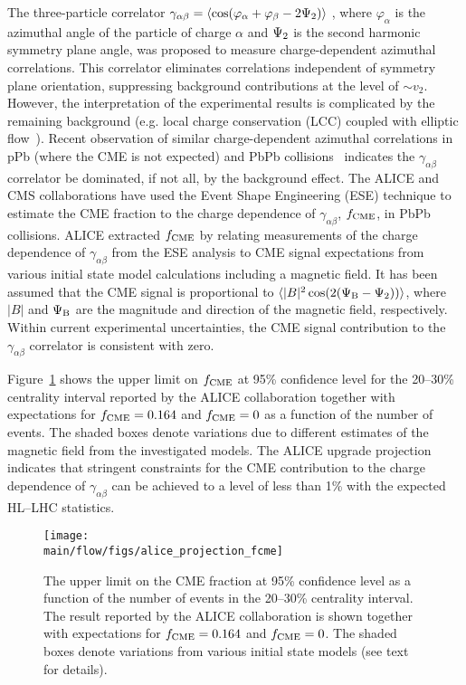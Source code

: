 The three-particle correlator $\gamma_{\alpha\beta} = \langle \cos(\varphi_{\alpha} + \varphi_{\beta} - 2\Psi_{\rm 2}) \rangle$ \cite{Voloshin:2004vk}, 
where $\varphi_{\alpha}$ is the azimuthal angle of the particle of charge $\alpha$ and $\Psi_{\rm 2}$ is the second harmonic symmetry plane 
angle, was proposed to measure charge-dependent azimuthal correlations. This correlator eliminates correlations independent of symmetry 
plane orientation, suppressing background contributions at the level of $\sim v_2$. However, the interpretation of the experimental results is 
complicated by the remaining background (e.g. local charge conservation (LCC) coupled with elliptic flow~\cite{Schlichting:2010qia, Pratt:2010zn}). 
Recent observation of similar charge-dependent azimuthal correlations in pPb (where the CME is not expected) and 
PbPb collisions~\cite{Khachatryan:2016got} indicates 
the $\gamma_{\alpha\beta}$ correlator be dominated, if not all, by the background effect.
The ALICE \cite{Acharya:2017fau} and CMS \cite{Sirunyan:2017quh} collaborations have used the Event Shape Engineering (ESE) technique 
\cite{Schukraft:2012ah} to estimate the CME fraction to the charge dependence of $\gamma_{\alpha\beta}$, $f_{\rm CME}$, in PbPb collisions. 
ALICE extracted 
$f_{\rm CME}$ by relating measurements of the charge dependence of $\gamma_{\alpha\beta}$ from the ESE analysis to CME signal expectations from 
various initial state model calculations including a magnetic field. It has been assumed that the CME signal is proportional to 
$\langle |B|^2 \cos(2(\Psi_{\rm B} - \Psi_2)) \rangle$, where $|B|$ and $\Psi_{\rm B}$ are the magnitude and direction of the magnetic field, respectively. Within current experimental uncertainties, the CME signal contribution to the $\gamma_{\alpha\beta}$ correlator is consistent with zero.

Figure~\ref{fig:alice_fcme} shows the upper limit on $f_{\rm CME}$ at 95\% confidence level for the 20--30\% centrality interval reported by the 
ALICE collaboration together with expectations for $f_{\rm CME}=0.164$ and $f_{\rm CME}=0$ as a function of the number of events. The shaded 
boxes denote variations due to different estimates of the magnetic field from the investigated models. The ALICE upgrade projection indicates that 
stringent constraints for the CME contribution to the charge dependence of $\gamma_{\alpha\beta}$ can be achieved to a level of less than 1\% 
with the expected HL--LHC statistics. 

\begin{figure}[!htb]
\begin{center}
\texttt{[image: \\main/flow/figs/alice\_projection\_fcme]}
\caption{The upper limit on the CME fraction at 95\% confidence level as a function of the number of events in the 20--30\% centrality interval. The result reported by the ALICE collaboration \cite{Acharya:2017fau} is shown together with expectations for $f_{\rm CME}=0.164$ and $f_{\rm CME}=0$. The shaded boxes denote variations from various initial state models (see text for details).}
\label{fig:alice_fcme}
\end{center}
\end{figure}

